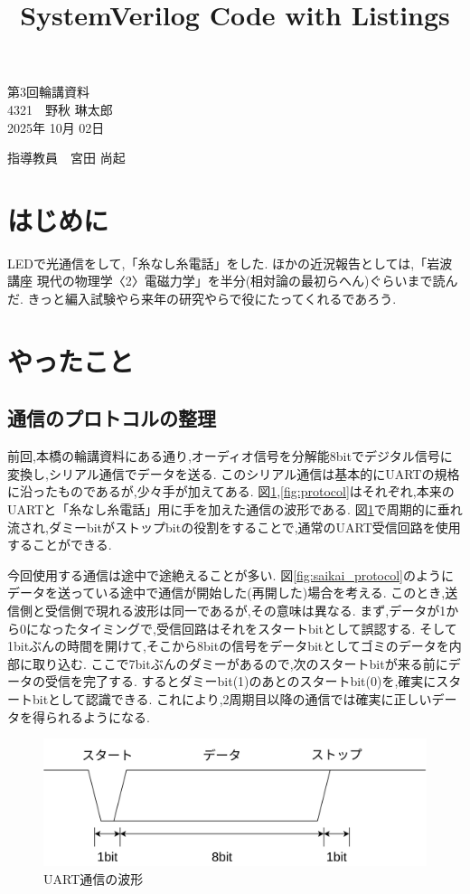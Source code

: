 \documentclass[a4paper,10pt]{article}
\title{SystemVerilog Code with Listings}
\begin{document}
\begin{center}
\noindent
{\LARGE 第3回輪講資料} \\
{\large 4321　野秋 琳太郎} \\
2025年 10月 02日
\end{center}

\begin{flushright}
指導教員　宮田 尚起
\end{flushright}

\begin{multicols}{2}

\section{はじめに}
LEDで光通信をして,「糸なし糸電話」をした.
ほかの近況報告としては,「岩波講座 現代の物理学〈2〉電磁力学」を半分(相対論の最初らへん)ぐらいまで読んだ.
きっと編入試験やら来年の研究やらで役にたってくれるであろう.

\section{やったこと}
\subsection{通信のプロトコルの整理}
前回,本橋の輪講資料にある通り,オーディオ信号を分解能8bitでデジタル信号に変換し,シリアル通信でデータを送る.
このシリアル通信は基本的にUARTの規格に沿ったものであるが,少々手が加えてある.
図\ref{fig:uart_protocol},\ref{fig:protocol}はそれぞれ,本来のUARTと「糸なし糸電話」用に手を加えた通信の波形である.
図\ref{fig:uart_protocol}で周期的に垂れ流され,ダミーbitがストップbitの役割をすることで,通常のUART受信回路を使用することができる.

今回使用する通信は途中で途絶えることが多い.
図\ref{fig:saikai_protocol}のようにデータを送っている途中で通信が開始した(再開した)場合を考える.
このとき,送信側と受信側で現れる波形は同一であるが,その意味は異なる.
まず,データが1から0になったタイミングで,受信回路はそれをスタートbitとして誤認する.
そして1bitぶんの時間を開けて,そこから8bitの信号をデータbitとしてゴミのデータを内部に取り込む.
ここで7bitぶんのダミーがあるので,次のスタートbitが来る前にデータの受信を完了する.
するとダミーbit(1)のあとのスタートbit(0)を,確実にスタートbitとして認識できる.
これにより,2周期目以降の通信では確実に正しいデータを得られるようになる.

\begin{figure}[H]
    \centering
    \includegraphics[width=0.9\linewidth]{figure/uart_protocol.png} 
    \caption{UART通信の波形} 
    \label{fig:uart_protocol}
\end{figure}
  

\end{multicols}
\end{document}
